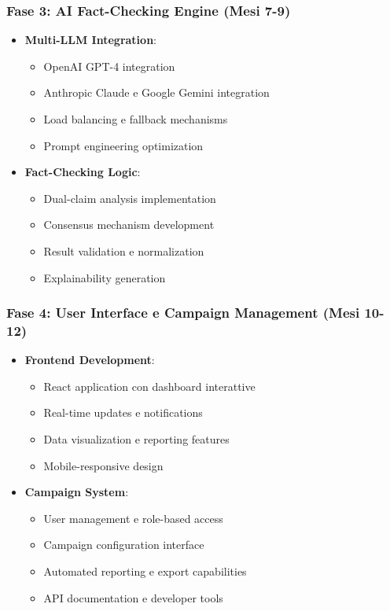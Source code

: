 \documentclass[12pt,a4paper]{report}
\begin{document}
\subsubsection{Fase 3: AI Fact-Checking Engine (Mesi 7-9)}

\begin{itemize}
    \item \textbf{Multi-LLM Integration}:
    \begin{itemize}
        \item OpenAI GPT-4 integration
        \item Anthropic Claude e Google Gemini integration
        \item Load balancing e fallback mechanisms
        \item Prompt engineering optimization
    \end{itemize}
    
    \item \textbf{Fact-Checking Logic}:
    \begin{itemize}
        \item Dual-claim analysis implementation
        \item Consensus mechanism development
        \item Result validation e normalization
        \item Explainability generation
    \end{itemize}
\end{itemize}

\subsubsection{Fase 4: User Interface e Campaign Management (Mesi 10-12)}

\begin{itemize}
    \item \textbf{Frontend Development}:
    \begin{itemize}
        \item React application con dashboard interattive
        \item Real-time updates e notifications
        \item Data visualization e reporting features
        \item Mobile-responsive design
    \end{itemize}
    
    \item \textbf{Campaign System}:
    \begin{itemize}
        \item User management e role-based access
        \item Campaign configuration interface
        \item Automated reporting e export capabilities
        \item API documentation e developer tools
    \end{itemize}
\end{itemize}
\end{document}
